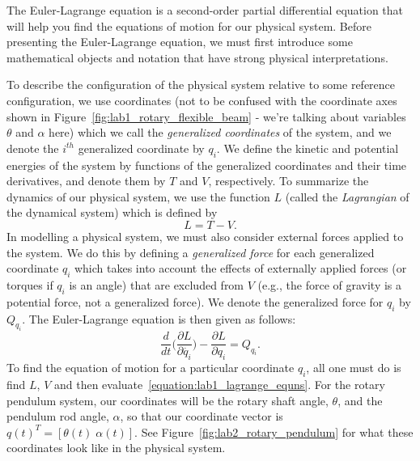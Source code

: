 The Euler-Lagrange equation is a second-order partial differential equation that will help you find the equations of motion for our physical system. Before presenting the Euler-Lagrange equation, we must first introduce some mathematical objects and notation that have strong physical interpretations.

To describe the configuration of the physical system relative to some reference configuration, we use coordinates (not to be confused with the coordinate axes shown in Figure~\ref{fig:lab1_rotary_flexible_beam} - we're talking about variables $\theta$ and $\alpha$ here) which we call the \emph{generalized coordinates} of the system, and we denote the $i^{th}$ generalized coordinate by $q_i$. We define the kinetic and potential energies of the system by functions of the generalized coordinates and their time derivatives, and denote them by $T$ and $V$, respectively. To summarize the dynamics of our physical system, we use the function $L$ (called the \emph{Lagrangian} of the dynamical system) which is defined by
\[
    L=T-V.
\]
In modelling a physical system, we must also consider external forces applied to the system. We do this by defining a \emph{generalized force} for each generalized coordinate $q_i$ which takes into account the effects of externally applied forces (or torques if $q_i$ is an angle) that are excluded from $V$ (e.g., the force of gravity is a potential force, not a generalized force). We denote the generalized force for $q_i$ by $Q_{q_i}$.
The Euler-Lagrange equation is then given as follows:
\begin{equation}\label{equation:lab1_lagrange_equns}
    \frac{d}{dt} \Bigg(\frac{\partial L}{\partial \dot{q_i}}\Bigg)  - \frac{\partial L}{\partial q_i} = Q_{q_i}.
\end{equation}
To find the equation of motion for a particular coordinate $q_i$, all one must do is find $L$, $V$ and then evaluate~\eqref{equation:lab1_lagrange_equns}. For the rotary pendulum system, our coordinates will be the rotary shaft angle, $\theta$, and the pendulum rod angle, $\alpha$, so that our coordinate vector is $q(t)^T=[\theta(t) \; \alpha(t)]$. See Figure~\ref{fig:lab2_rotary_pendulum} for what these coordinates look like in the physical system.

